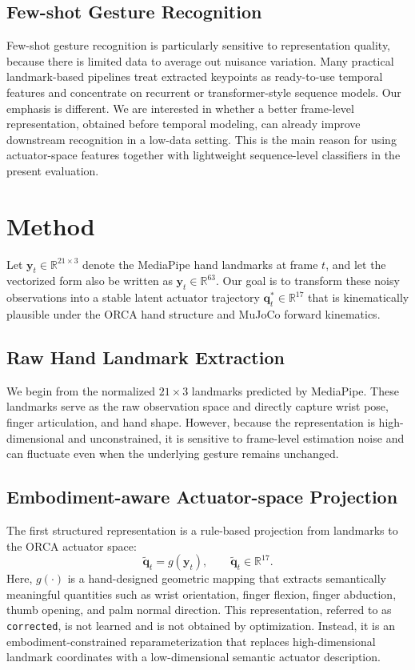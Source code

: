 \documentclass[11pt]{article}
\begin{document}
\subsection{Few-shot Gesture Recognition}
Few-shot gesture recognition is particularly sensitive to representation quality, because there is limited data to average out nuisance variation. Many practical landmark-based pipelines treat extracted keypoints as ready-to-use temporal features and concentrate on recurrent or transformer-style sequence models. Our emphasis is different. We are interested in whether a better frame-level representation, obtained before temporal modeling, can already improve downstream recognition in a low-data setting. This is the main reason for using actuator-space features together with lightweight sequence-level classifiers in the present evaluation.

\section{Method}
Let $\mathbf{y}_t \in \mathbb{R}^{21 \times 3}$ denote the MediaPipe hand landmarks at frame $t$, and let the vectorized form also be written as $\mathbf{y}_t \in \mathbb{R}^{63}$. Our goal is to transform these noisy observations into a stable latent actuator trajectory $\mathbf{q}_t^* \in \mathbb{R}^{17}$ that is kinematically plausible under the ORCA hand structure and MuJoCo forward kinematics.

\subsection{Raw Hand Landmark Extraction}
We begin from the normalized $21 \times 3$ landmarks predicted by MediaPipe. These landmarks serve as the raw observation space and directly capture wrist pose, finger articulation, and hand shape. However, because the representation is high-dimensional and unconstrained, it is sensitive to frame-level estimation noise and can fluctuate even when the underlying gesture remains unchanged.

\subsection{Embodiment-aware Actuator-space Projection}
The first structured representation is a rule-based projection from landmarks to the ORCA actuator space:
\[
\tilde{\mathbf{q}}_t = g(\mathbf{y}_t), \qquad \tilde{\mathbf{q}}_t \in \mathbb{R}^{17}.
\]
Here, $g(\cdot)$ is a hand-designed geometric mapping that extracts semantically meaningful quantities such as wrist orientation, finger flexion, finger abduction, thumb opening, and palm normal direction. This representation, referred to as \texttt{corrected}, is not learned and is not obtained by optimization. Instead, it is an embodiment-constrained reparameterization that replaces high-dimensional landmark coordinates with a low-dimensional semantic actuator description.
\end{document}
